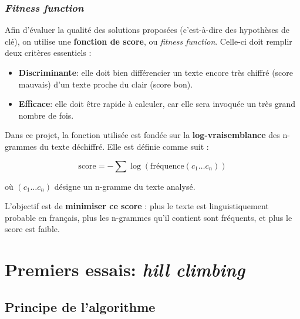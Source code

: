 \documentclass[a4paper]{article}
\begin{document}
\subsubsection{\textit{Fitness function}}

Afin d’évaluer la qualité des solutions proposées (c’est-à-dire des hypothèses de clé), on utilise une \textbf{fonction de score}, ou \textit{fitness function}. Celle-ci doit remplir deux critères essentiels :

\begin{itemize}
    \item \textbf{Discriminante}: elle doit bien différencier un texte encore très chiffré (score mauvais) d’un texte proche du clair (score bon).
    \item \textbf{Efficace}: elle doit être rapide à calculer, car elle sera invoquée un très grand nombre de fois.
\end{itemize}

Dans ce projet, la fonction utilisée est fondée sur la \textbf{log-vraisemblance} des n-grammes du texte déchiffré. Elle est définie comme suit :

\[
\text{score} = - \sum \log\left(\text{fréquence}(c_1 \ldots c_n)\right)
\]

où $(c_1 \ldots c_n)$ désigne un n-gramme du texte analysé.

L’objectif est de \textbf{minimiser ce score} : plus le texte est linguistiquement probable en français, plus les n-grammes qu’il contient sont fréquents, et plus le score est faible.


\section{Premiers essais: \textit{hill climbing}}

\subsection{Principe de l’algorithme}
\end{document}
